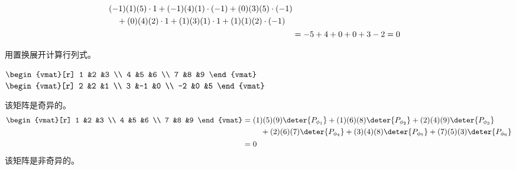 \begin{exercises}
\begin{answer}
\begin{align*}
\begin{aligned}[t]
              &(-1)(1)(5)\cdot 1
              +(-1)(4)(1)\cdot (-1)
              +(0)(3)(5)\cdot (-1)  \\
              &\hbox{}\quad\hbox{}
              +(0)(4)(2)\cdot 1
              +(1)(3)(1)\cdot 1
              +(1)(1)(2)\cdot (-1)
            \end{aligned}                        \\
            &=-5+4+0+0+3-2=0
          \end{align*}
    \end{answer}
  \recommended \item
    用置换展开计算行列式。
    \begin{exparts*}
      \partsitem
        $\begin{vmat}[r]
          1  &2  &3  \\
          4  &5  &6  \\
          7  &8  &9
        \end{vmat}$
      \partsitem
        $\begin{vmat}[r]
          2  &2  &1  \\
          3  &-1 &0  \\
          -2 &0  &5
        \end{vmat}$
    \end{exparts*}
    \begin{answer}
      \begin{exparts}
        \partsitem 该矩阵是奇异的。
          \begin{align*}
            \begin{vmat}[r]
              1  &2  &3  \\
              4  &5  &6  \\
              7  &8  &9
            \end{vmat}
            &=
            \begin{aligned}[t]
              &(1)(5)(9)\deter{P_{\phi_1}}
              +(1)(6)(8)\deter{P_{\phi_2}}
              +(2)(4)(9)\deter{P_{\phi_3}}  \\
              &\hbox{}\quad\hbox{}
              +(2)(6)(7)\deter{P_{\phi_4}}
              +(3)(4)(8)\deter{P_{\phi_5}}
              +(7)(5)(3)\deter{P_{\phi_6}}
            \end{aligned}                        \\
            &=0
          \end{align*}
        \partsitem 该矩阵是非奇异的。
          \begin{align*}

\end{align*}
\end{exparts}
\end{answer}
\end{exercises}
